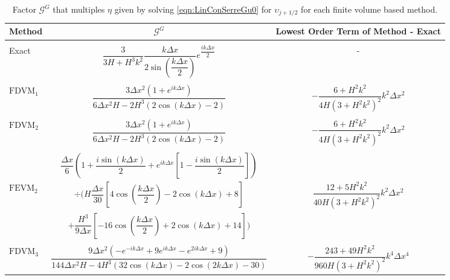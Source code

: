 \begin{landscape}
	\begin{table}
		\centering   
		\begin{tabular}{l  c  c}
			Method& $\mathcal{G}^G$ & Lowest Order Term of Method - Exact \T \\
			\hline \\ 
			Exact &  $\dfrac{3 }{3H + H^3k^2} \dfrac{k\Delta x}{2 \sin\left(\dfrac{k \Delta x}{2}\right)}e^{\dfrac{ik\Delta x}{2}}$ & - \\ \\
			$\text{FDVM}_1$& $\dfrac{3\Delta x^2 \left(1 + e^{ik\Delta x}\right)}{6\Delta x^2 H - 2H^3 \left(2\cos\left(k\Delta x\right) - 2\right)}$ & $-\dfrac{6 +H^2k^2}{4H \left(3 + H^2k^2\right)^2}k^2 \Delta x^2$  \\ \\
			$\text{FDVM}_2$& $\dfrac{3 \Delta x^2 \left({1 + e^{ik\Delta x}}\right)}{6 \Delta x^2 H - 2H^3 \left(2\cos\left(k\Delta x\right) - 2\right)}$ & $-\dfrac{6 +H^2k^2}{4H \left(3 + H^2k^2\right)^2}k^2 \Delta x^2$  \\ \\
			& $\dfrac{\Delta x}{6} \left(1 + \dfrac{i \sin\left(k \Delta x\right)}{2} + e^{ik\Delta x}\left[1 - \dfrac{i \sin\left(k \Delta x\right)}{2}\right] \right)$ & \\  $\text{FEVM}_2$ & $\div  \Bigg( H\dfrac{\Delta x}{30} \left[4\cos\left(\dfrac{k \Delta x}{2}\right) - 2\cos\left({k \Delta x}\right) + 8\right] $  & $\dfrac{12 + 5H^2k^2}{40H \left(3 + H^2k^2\right)^2}k^2 \Delta x^2$ \\ &$+ \dfrac{H^3 }{9\Delta x}\left[-16\cos\left(\dfrac{k\Delta x}{2}\right) + 2 \cos\left(k \Delta x\right) + 14\right]    \Bigg)$ & \\ \\
			$\text{FDVM}_3$&  $\dfrac{9 \Delta x^2 \left({-e^{-ik\Delta x} + 9e^{ik\Delta x} - e^{2ik\Delta x} + 9}\right)}{144 \Delta x^2H - 4H^3\left(32\cos\left(k \Delta x\right) -2\cos\left(2k \Delta x\right) - 30\right)}$ & $-\dfrac{243 + 49H^2k^2}{960H\left(3 + H^2k^2\right)^2}k^4 \Delta x^4$ \T \B \\
			\hline
		\end{tabular}
		\caption{Factor $\mathcal{G}^G$ that multiples $\eta$ given by solving \eqref{eqn:LinConSerreGu0} for $\upsilon_{j+1/2}$ for each finite volume based method.}
		\label{tab:GGfactor} 
	\end{table}
\end{landscape}


